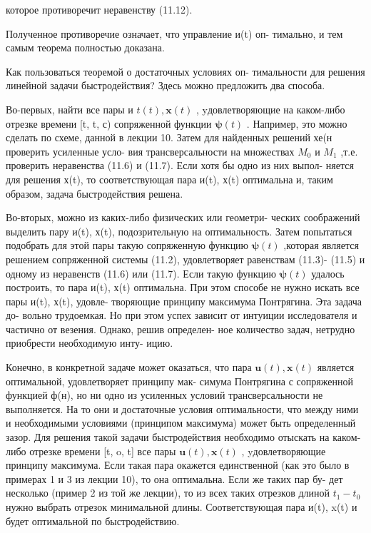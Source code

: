 \documentclass[8pt]{extarticle}
\begin{document}
которое противоречит неравенству (11.12).

Полученное противоречие означает, что управление и(t) оп- тимально, и тем самым теорема полностью доказана.

Как пользоваться теоремой о достаточных условиях оп- тимальности для решения линейной задачи быстродействия? Здесь можно предложить два способа.

Во-первых, найти все пары и \(t\left( t\right) ,\mathbf{x}\left( t\right)\) , yдовлетворяющие на каком-либо отрезке времени [t, t, с) сопряженной функции \(\mathbf{\psi }\left( t\right)\) . Например, это можно сделать по схеме, данной в лекции 10. Затем для найденных решений хе(н проверить усиленные усло- вия трансверсальности на множествах \({M}_{0}\) и \({M}_{1}\) ,т.е. проверить неравенства (11.6) и (11.7). Если хотя бы одно из них выпол- няется для решения х(t), то соответствующая пара и(t), х(t) оптимальна и, таким образом, задача быстродействия решена.

Во-вторых, можно из каких-либо физических или геометри- ческих соображений выделить пару и(t), х(t), подозрительную на оптимальность. Затем попытаться подобрать для этой пары такую сопряженную функцию \(\mathbf{\psi }\left( t\right)\) ,которая является решением сопряженной системы (11.2), удовлетворяет равенствам (11.3)- (11.5) и одному из неравенств (11.6) или (11.7). Если такую функцию \(\mathbf{\psi }\left( t\right)\) удалось построить, то пара и(t), х(t) оптимальна. При этом способе не нужно искать все пары и(t), х(t), удовле- творяющие принципу максимума Понтрягина. Эта задача до- вольно трудоемкая. Но при этом успех зависит от интуиции исследователя и частично от везения. Однако, решив определен- ное количество задач, нетрудно приобрести необходимую инту- ицию.

Конечно, в конкретной задаче может оказаться, что пара \(\mathbf{u}\left( t\right) ,\mathbf{x}\left( t\right)\) является оптимальной, удовлетворяет принципу мак- симума Понтрягина с сопряженной функцией ф(н), но ни одно из усиленных условий трансверсальности не выполняется. На то они и достаточные условия оптимальности, что между ними и необходимыми условиями (принципом максимума) может быть определенный зазор. Для решения такой задачи быстродействия необходимо отыскать на каком-либо отрезке времени [t, o, t] все пары \(\mathbf{u}\left( t\right) ,\mathbf{x}\left( t\right)\) , yдовлетворяющие принципу максимума. Если такая пара окажется единственной (как это было в примерах 1 и 3 из лекции 10), то она оптимальна. Если же таких пар бу- дет несколько (пример 2 из той же лекции), то из всех таких отрезков длиной \({t}_{1} - {t}_{0}\) нужно выбрать отрезок минимальной длины. Соответствующая пара и(t), x(t) и будет оптимальной по быстродействию.
\end{document}

